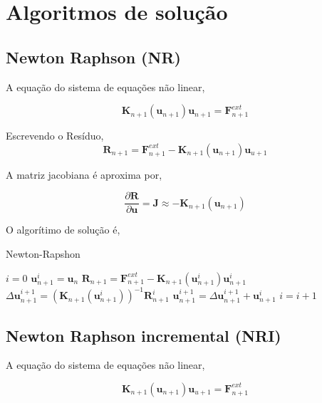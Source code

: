 \documentclass[12pt,a4paper]{article}
\begin{document}
\section{Algoritmos de solução}

\subsection{Newton Raphson (NR)}

A equação do sistema de equações não linear,

\begin{equation}
\mathbf{K}_{n+1}(\mathbf{u}_{n+1}) \mathbf{u}_{n+1} = \mathbf{F}^{ext}_{n+1}
\end{equation}

\noindent 
Escrevendo o Resíduo,
\begin{equation}
\mathbf{R}_{n+1} = \mathbf{F}^{ext}_{n+1} - \mathbf{K}_{n+1}(\mathbf{u}_{n+1}) \mathbf{u}_{u+1} 
\end{equation}

\noindent 
A matriz jacobiana é aproxima por,

\begin{equation}
\frac{\partial \mathbf{R}}{\partial \mathbf{u}} = \mathbf{J} \approx - \mathbf{K}_{n+1}(\mathbf{u}_{n+1}) 
\end{equation}

\noindent
O algorítimo de solução é,

\begin{algorithm}[H]
\caption{Newton-Rapshon}
\begin{algorithmic}
\STATE $i = 0$
\STATE $\mathbf{u}^{i}_{n+1} = \mathbf{u}_n$
    \STATE $\mathbf{R}_{n+1} = \mathbf{F}^{ext}_{n+1} - \mathbf{K}_{n+1}(\mathbf{u}^i_{n+1}) \mathbf{u}^i_{n+1} $ 
    \STATE $\Delta \mathbf{u}^{i+1}_{n+1} = \left(\mathbf{K}_{n+1}(\mathbf{u}^i_{n+1})\right)^{-1} \mathbf{R}^i_{n+1}$ 
    \STATE $\mathbf{u}^{i+1}_{n+1} = \Delta \mathbf{u}^{i+1}_{n+1} + \mathbf{u}^{i}_{n+1}$
	\STATE $i = i+1$
\ENDWHILE	
\end{algorithmic}
\end{algorithm}

\subsection{Newton Raphson incremental (NRI)}

A equação do sistema de equações não linear,

\begin{equation}
\mathbf{K}_{n+1}(\mathbf{u}_{n+1}) \mathbf{u}_{u+1} = \mathbf{F}^{ext}_{n+1}
\end{equation}
\end{document}
